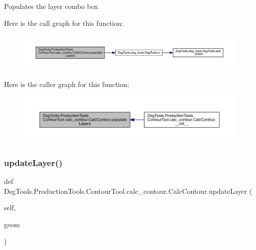 \begin{DoxyVerb}Populates the layer combo box
\end{DoxyVerb}
 Here is the call graph for this function\+:
\nopagebreak
\begin{figure}[H]
\begin{center}
\leavevmode
\includegraphics[width=350pt]{class_dsg_tools_1_1_production_tools_1_1_contour_tool_1_1calc__contour_1_1_calc_contour_ad7e4f68d2e9a1cd8e06d46c46fa83e04_cgraph}
\end{center}
\end{figure}
Here is the caller graph for this function\+:
\nopagebreak
\begin{figure}[H]
\begin{center}
\leavevmode
\includegraphics[width=350pt]{class_dsg_tools_1_1_production_tools_1_1_contour_tool_1_1calc__contour_1_1_calc_contour_ad7e4f68d2e9a1cd8e06d46c46fa83e04_icgraph}
\end{center}
\end{figure}
\mbox{\label{class_dsg_tools_1_1_production_tools_1_1_contour_tool_1_1calc__contour_1_1_calc_contour_a909c2b0fc4a807a06532ddfbc44c8199}} 
\subsubsection{\texorpdfstring{update\+Layer()}{updateLayer()}}
{\footnotesize\ttfamily def Dsg\+Tools.\+Production\+Tools.\+Contour\+Tool.\+calc\+\_\+contour.\+Calc\+Contour.\+update\+Layer (\begin{DoxyParamCaption}\item[{}]{self,  }\item[{}]{geom }\end{DoxyParamCaption})}

